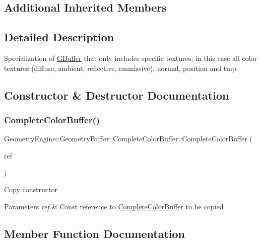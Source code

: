\subsection*{Additional Inherited Members}


\subsection{Detailed Description}
Specialization of \mbox{\hyperlink{class_geometry_engine_1_1_geometry_buffer_1_1_g_buffer}{G\+Buffer}} that only includes specific textures, in this case all color textures (diffuse, ambient, reflective, emmissive), normal, position and tmp. 

\subsection{Constructor \& Destructor Documentation}
\mbox{\label{class_geometry_engine_1_1_geometry_buffer_1_1_complete_color_buffer_ad1b8c2aed3b0c6154836275c91964a5a}} 
\subsubsection{\texorpdfstring{CompleteColorBuffer()}{CompleteColorBuffer()}}
{\footnotesize\ttfamily Geometry\+Engine\+::\+Geometry\+Buffer\+::\+Complete\+Color\+Buffer\+::\+Complete\+Color\+Buffer (\begin{DoxyParamCaption}\item[{const \mbox{\hyperlink{class_geometry_engine_1_1_geometry_buffer_1_1_complete_color_buffer}{Complete\+Color\+Buffer}} \&}]{ref }\end{DoxyParamCaption})}

Copy constructor 
\begin{DoxyParams}{Parameters}
{\em ref} & Const reference to \mbox{\hyperlink{class_geometry_engine_1_1_geometry_buffer_1_1_complete_color_buffer}{Complete\+Color\+Buffer}} to be copied \\
\hline
\end{DoxyParams}


\subsection{Member Function Documentation}
\mbox{\label{class_geometry_engine_1_1_geometry_buffer_1_1_complete_color_buffer_a56aee74c7523f0b16fd8b97c8c44f84f}} 
